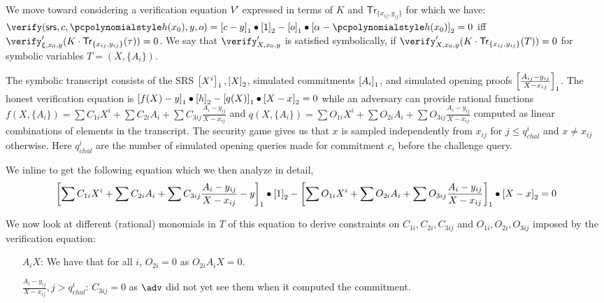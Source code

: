 \documentclass[runningheads,11pt]{llncs}
\begin{document}
We move toward considering a verification equation $V'$ expressed in terms of $K$ and
$\mathsf{Tr}_{\{x_{ij},y_{ij}\}}$ for which we have:
$\verify (\srs, c, \p{h} (x_0), y, o) = \gone{c - y} \bullet \gtwo{1} - \gone{o} \bullet
\gtwo{\alpha - \p{h} (x_0)} = 0$ iff
$\verify'_{{\xi, x_0, y}}(K \cdot \mathsf{Tr}_{\{x_{ij},y_{ij}\}} (\tau)) = 0$. 
%
We say that $\verify'_{{X,x_0,y}}$ is satisfied symbolically, if
$\verify'_{{X,x_0,y}}(K \cdot \mathsf{Tr}_{\{x_{ij},y_{ij}\}} (T)) = 0$ for symbolic
variables $T=(X, \{A_{i}\})$. 

The symbolic transcript consists of the SRS $\left[X^{i}\right]_{1}, \left[X\right]_{2}$, simulated commitments $\left[A_{i}\right]_{1}$, and simulated opening proofs $ \left[\frac{A_{ij}-y_{{ij}}}{X-x_{ij}}\right]_{1}$.
%
The honest verification equation is
$\left[f(X) - y\right]_{1} \bullet \left[h\right]_{2} - \left[q(X)\right]_{1} \bullet \left[X - x\right]_{2} = 0$ while an
adversary can provide rational functions
$f(X, \{A_{i}\}) = \sum C_{1i} X^{i} + \sum C_{2i} A_{i} + \sum C_{3ij}
\frac{A_{i}-y_{ij}}{X-x_{ij}}$ and
$q(X, \{A_{i}\}) = \sum O_{1i} X^{i} + \sum O_{2i} A_{i} + \sum O_{3ij} \frac{A_{i}-
  y_{ij}}{X-x_{ij}}$ computed as linear combinations of elements in the transcript.
The security game gives us that $x$ is sampled independently from $x_{ij}$ for
$j\leq q^{i}_{chal}$ and $x \neq x_{ij}$ otherwise. Here $q^{i}_{chal}$ are the
number of simulated opening queries made for commitment $c_{i}$ before the challenge
query.

We inline to get the following equation which we then analyze in detail,
\begin{align*}
  \left[\sum C_{1i} X^{i} + \sum C_{2i} A_{i} + \sum C_{3ij}
  \frac{A_{i}-y_{ij}}{X-x_{ij}} - y\right]_{1} \bullet \left[1\right]_{2} - \left[\sum O_{1i} X^{i}
  + \sum O_{2i} A_{i} + \sum O_{3ij} \frac{A_{i}-y_{ij}}{X-x_{ij}}\right]_{1} \bullet \left[X -
  x\right]_{2} = 0
\end{align*}

We now look at different (rational) monomials in $T$ of this equation to derive
constraints on $C_{1i}, C_{{2i}},C_{{3ij}}$ and $O_{1i},O_{2i},O_{3ij}$ imposed by
the verification equation:
\begin{itemize}
  \item[$A_{i}X$:] We have that for all $i$, $O_{2i}=0$ as $O_{2i} A_{i} X = 0$.
  \item[$\frac{A_{i}-y_{ij}}{X-x_{ij}}, j>q^{i}_{chal}$:] $C_{3ij}=0$ as $\adv$ did
    not yet see them when it computed the commitment.
\end{itemize}
\end{document}

